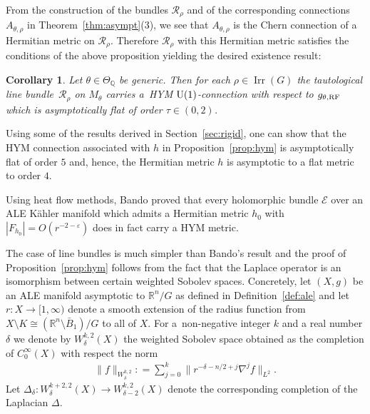 \documentclass[pdftex]{sigma}
\numberwithin{equation}{section}
\newcommand{\cE}{\mathcal{E}}
\newcommand{\cR}{\mathcal{R}}
\newcommand{\Q}{{\mathbb Q}}
\newcommand{\R}{{\mathbb R}}
\newcommand{\U}{{\rm U}}
\renewcommand{\epsilon}{\varepsilon}
\newcommand{\eps}{\epsilon}
\newcommand{\Irr}{\operatorname{Irr}}
\newcommand{\iso}{\cong}
\newcommand{\RF}{{\rm RF}}
\newtheorem{Corollary}[Theorem]{Corollary}
\begin{document}
From the construction of the bundles $\cR_{\rho}$ and of the
corresponding connections $A_{\theta,\rho}$ in
Theorem~\ref{thm:asympt}(3), we see that
$A_{\theta, \rho}$ is the Chern connection of a Hermitian metric on
$\cR_{\rho}$. Therefore $\cR_{\rho}$ with this Hermitian metric
satisf\/ies the conditions of the above proposition yielding the desired
existence result:

\begin{Corollary}
  Let $\theta \in \Theta_{\Q}$ be generic.  Then for each
  $\rho\in\Irr(G)$ the tautological line bundle~$\cR_\rho$ on
  $M_\theta$ carries a~HYM $\U(1)$-connection with respect to
  $g_{\theta,\RF}$ which is asymptotically flat of order $\tau \in (0,2)$.
\end{Corollary}

\begin{Remark}
  Using some of the results derived in Section~\ref{sec:rigid}, one
  can show that the HYM connection associated with $h$ in
  Proposition~\ref{prop:hym} is asymptotically f\/lat of order $5$ and,
  hence, the Hermitian metric $h$ is asymptotic to a f\/lat metric to
  order $4$.
\end{Remark}

\begin{Remark}
  Using heat f\/low methods, Bando \cite{Bando1993} proved that every
  holomorphic bundle $\cE$ over an ALE K\"ahler manifold which admits a
  Hermitian metric $h_0$ with $|F_{h_0}|=O(r^{-2-\eps})$ does in
  fact carry a HYM metric.
\end{Remark}

The case of line bundles is much simpler than Bando's result and the
proof of Proposition~\ref{prop:hym} follows from the fact that the
Laplace operator is an isomorphism between certain weighted Sobolev
spaces.  Concretely, let $(X, g)$ be an ALE manifold asymptotic to
$\R^n/G$ as def\/ined in Def\/inition~\ref{def:ale} and let $r\colon
X\to[1,\infty)$ denote a smooth extension of the radius function from
$X{\setminus} K \iso (\R^n{\setminus} \bar B_1)/G$ to all of $X$.  For a~non-negative integer $k$ and a real number $\delta$ we denote by
$W^{k,2}_{\delta}(X)$ the weighted Sobolev space obtained as the
completion of $C^\infty_0(X)$ with respect the norm
\begin{gather}\label{eq:wsf}
  \|f\|_{W^{k,2}_\delta}: = \sum_{j=0}^k \big\|r^{-\delta-n/2+j}\nabla ^jf\big\|_{L^2}.
\end{gather}
Let $\Delta_{\delta}\colon W^{k+2,2}_\delta(X) \to W^{k,2}_{\delta-2}(X)$
denote the corresponding completion of the Laplacian $\Delta$.
\end{document}
